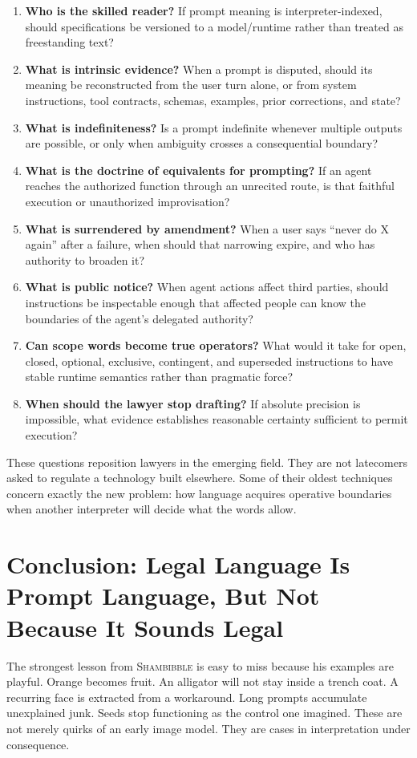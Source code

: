 \documentclass[11pt]{article}
\newcommand{\sham}{\textsc{Shambibble}\xspace}
\begin{document}
\begin{enumerate}[leftmargin=1.7em]
\item \textbf{Who is the skilled reader?} If prompt meaning is interpreter-indexed, should specifications be versioned to a model/runtime rather than treated as freestanding text?
\item \textbf{What is intrinsic evidence?} When a prompt is disputed, should its meaning be reconstructed from the user turn alone, or from system instructions, tool contracts, schemas, examples, prior corrections, and state?
\item \textbf{What is indefiniteness?} Is a prompt indefinite whenever multiple outputs are possible, or only when ambiguity crosses a consequential boundary?
\item \textbf{What is the doctrine of equivalents for prompting?} If an agent reaches the authorized function through an unrecited route, is that faithful execution or unauthorized improvisation?
\item \textbf{What is surrendered by amendment?} When a user says ``never do X again'' after a failure, when should that narrowing expire, and who has authority to broaden it?
\item \textbf{What is public notice?} When agent actions affect third parties, should instructions be inspectable enough that affected people can know the boundaries of the agent's delegated authority?
\item \textbf{Can scope words become true operators?} What would it take for open, closed, optional, exclusive, contingent, and superseded instructions to have stable runtime semantics rather than pragmatic force?
\item \textbf{When should the lawyer stop drafting?} If absolute precision is impossible, what evidence establishes reasonable certainty sufficient to permit execution?
\end{enumerate}

These questions reposition lawyers in the emerging field. They are not latecomers asked to regulate a technology built elsewhere. Some of their oldest techniques concern exactly the new problem: how language acquires operative boundaries when another interpreter will decide what the words allow.

\section*{Conclusion: Legal Language Is Prompt Language, But Not Because It Sounds Legal}
The strongest lesson from \sham is easy to miss because his examples are playful. Orange becomes fruit. An alligator will not stay inside a trench coat. A recurring face is extracted from a workaround. Long prompts accumulate unexplained junk. Seeds stop functioning as the control one imagined. These are not merely quirks of an early image model. They are cases in interpretation under consequence.
\end{document}

